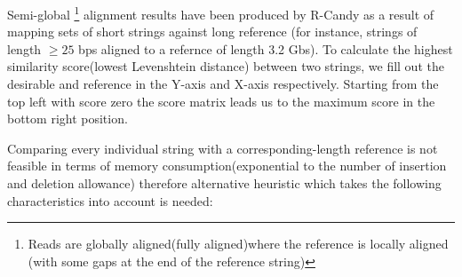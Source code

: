 \documentclass[11pt,a4paper]{report}
\begin{document}
Semi-global \footnote{Reads are globally aligned(fully aligned)where the reference is
locally aligned (with some gaps at the end of the reference string)} alignment results
have been produced by R-Candy as a result of mapping sets of short strings against 
long reference (for instance, strings of length $\geq 25$ bps aligned to a refernce of length 3.2 Gbs).
To calculate the highest similarity score(lowest Levenshtein distance) between two strings, 
we fill out the desirable and reference in the Y-axis and X-axis respectively.
Starting from the top left with score zero the score matrix leads us to the 
maximum score in the bottom right position.

Comparing every individual string with a corresponding-length reference is not feasible in
terms of memory consumption(exponential to the number of insertion and deletion allowance) 
therefore alternative heuristic which takes the following characteristics into account is needed: 
\end{document}
